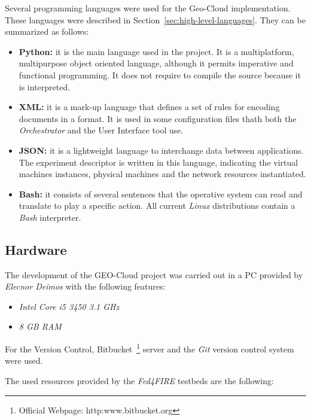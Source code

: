 Several programming languages were used for the Geo-Cloud
implementation. These languages were described in
Section~\ref{sec:high-level-languages}. They can be
summarized as follows:

\begin{itemize}
\item \textbf{Python:}  it is the main language used in the project. It is a
  multiplatform, multipurpose object oriented language, although it permits imperative and functional
programming. It does not require to compile the source because it is
interpreted.
 \item \textbf{\ac{XML}:} it is a mark-up language that defines a set of rules for encoding
documents in a format. It is used in some configuration files thath both the
\emph{Orchestrator} and the User Interface tool use.

\item \textbf{\ac{JSON}:} it is a lightweight language to interchange data between
  applications. The \bonfire experiment descriptor is written in this
  language, indicating the virtual machines instances, physical machines and the
  network resources instantiated.

\item \textbf{Bash:} it consists of several sentences that the operative system can read and translate to play a specific action. All current
\emph{Linux} distributions contain a \emph{Bash} interpreter. 

\end{itemize}


\subsection{Hardware}

The development of the GEO-Cloud project was carried out in a PC provided by
\emph{Elecnor Deimos} with the following features:
\begin{itemize}
\item \emph{Intel Core i5 3450 3.1 GHz}
\item \emph{8 GB RAM}
\end{itemize}

For the Version Control, Bitbucket~\footnote{Official Webpage:
  http:www.bitbucket.org} server and the \emph{Git} version control system were used.

The used resources provided  by the \emph{Fed4FIRE} testbeds are the following:

